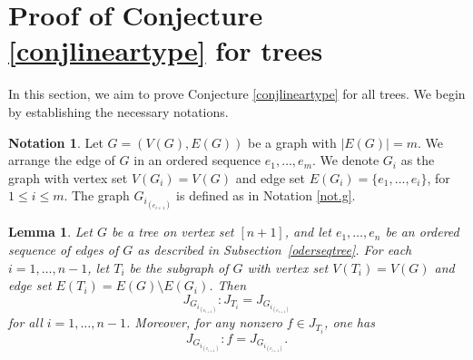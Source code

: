 \documentclass[11pt,a4paper,reqno]{amsart}
\newtheorem{lemma}[theorem]{Lemma}
\theoremstyle{definition}
\newtheorem{notation}[theorem]{Notation}
\begin{document}
\section{Proof of Conjecture \ref{conjlineartype} for trees} \label{sec.con}
In this section, we aim to prove Conjecture \ref{conjlineartype} for all trees. We begin by establishing the necessary notations.


\begin{notation}
    Let $G=(V(G),E(G))$ be a graph with $\lvert E(G) \rvert = m$. We arrange the edge of $G$ in an ordered sequence $e_1,\ldots,e_m$. We denote $G_i$ as the graph with vertex set $V(G_i)=V(G)$ and edge set $E(G_i)=\{e_1,\ldots,e_i\}$, for $1\leq i \leq m$. The graph $G_{i_{(e_{i+1})}}$ is defined as in Notation \ref{not.g}.
\end{notation}




\begin{lemma}\label{lem.colon.bi.ideal}
Let \(G\) be a tree on vertex set \([n+1]\), and let \(e_1,\ldots,e_n\) be an ordered sequence of edges of \(G\) as described in Subsection~\ref{oderseqtree}. For each \(i=1,\ldots,n-1\), let \(T_i\) be the subgraph of \(G\) with vertex set \(V(T_i)=V(G)\) and edge set \(E(T_i)=E(G)\setminus E(G_i)\). Then
\begin{equation}\label{eq.colon}
J_{G_{i_{(e_{i+1})}}}:J_{T_i} = J_{G_{i_{(e_{i+1})}}}
\end{equation}
for all \(i=1,\ldots,n-1\). Moreover, for any nonzero \(f \in J_{T_i}\), one has
\[
J_{G_{i_{(e_{i+1})}}}:f = J_{G_{i_{(e_{i+1})}}}.
\]
\end{lemma}
\end{document}
